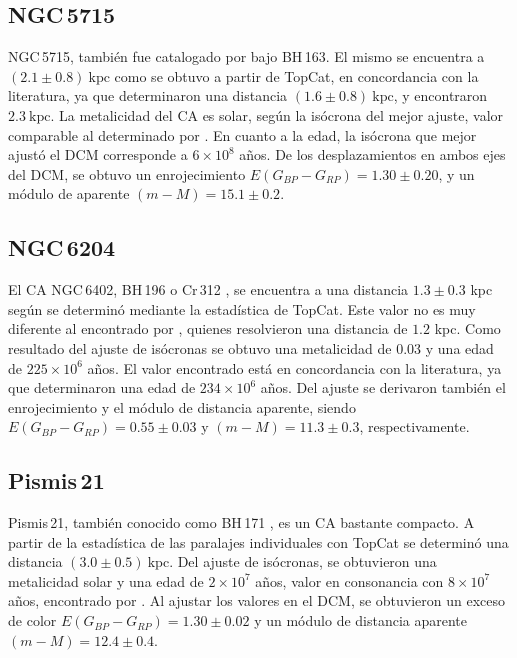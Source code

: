 \documentclass[baaa]{baaa}
\begin{document}
\subsection{NGC\,5715}
NGC\,5715, también fue catalogado por \cite{BH1975} bajo BH\,163. El mismo se encuentra a $(2.1 \pm 0.8)~\mathrm{kpc}$ como se obtuvo a partir de {\sc TopCat}, en concordancia con la literatura, ya que \cite{C12} determinaron una distancia $(1.6 \pm 0.8)~\mathrm{kpc}$, y \cite{CG20} encontraron $2.3~\mathrm{kpc}$. La metalicidad del CA es solar, seg\'un la is\'ocrona del mejor ajuste, valor comparable al determinado por \cite{C12}. En cuanto a la edad, la is\'ocrona que mejor ajust\'o el DCM corresponde a $6 \times 10^8$ a\~nos. De los desplazamientos en ambos ejes del DCM, se obtuvo un enrojecimiento $E(G_{BP} - G_{RP}) = 1.30 \pm 0.20$, y un m\'odulo de aparente $(m - M) = 15.1 \pm 0.2$.

\subsection{NGC\,6204}
El CA NGC\,6402, BH\,196 \citep{BH1975} o Cr\,312 \citep{Cr1931}, se encuentra a una distancia $1.3 \pm 0.3$ kpc según se determinó mediante la estadística de {\sc TopCat}. Este valor no es muy diferente al encontrado por \cite{P22}, quienes resolvieron una distancia de $1.2$ kpc. Como resultado del ajuste de isócronas se obtuvo una metalicidad de $0.03$ y una edad de $225 \times 10^6$ a\~nos. El valor encontrado est\'a en concordancia con la literatura, ya que \cite{P22} determinaron una edad de $234 \times 10^6$ a\~nos. Del ajuste se derivaron también el enrojecimiento y el módulo de distancia aparente, siendo $E(G_{BP} - G_{RP}) = 0.55 \pm 0.03$ y $(m - M) = 11.3 \pm 0.3$, respectivamente. 

\subsection{Pismis\,21}
Pismis\,21, también conocido como BH\,171 \citep{BH1975}, es un CA bastante compacto. A partir de la estad\'istica de las paralajes individuales con {\sc TopCat} se determin\'o una distancia $(3.0 \pm 0.5)~\mathrm{kpc}$. Del ajuste de is\'ocronas, se obtuvieron una metalicidad solar y una edad de $2 \times 10^7$ a\~nos, valor en consonancia con $8 \times 10^7$ a\~nos, encontrado por \cite{A00}. Al ajustar los valores en el DCM, se obtuvieron un exceso de color $E(G_{BP} - G_{RP}) = 1.30 \pm 0.02$ y un m\'odulo de distancia aparente $(m - M) = 12.4 \pm 0.4$.
\end{document}
